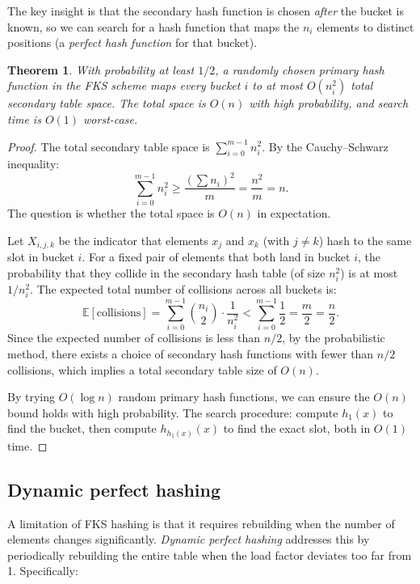 \documentclass[twoside,12pt]{book}
\theoremstyle{plain}
\newtheorem{theorem}{Theorem}[chapter]
\theoremstyle{definition}
\theoremstyle{remark}
\begin{document}
The key insight is that the secondary hash function is chosen \emph{after} the bucket is known, so we can search for a hash function that maps the $n_i$ elements to distinct positions (a \emph{perfect hash function} for that bucket).

\begin{theorem}\label{thm:fks}
With probability at least $1/2$, a randomly chosen primary hash function in the FKS scheme maps every bucket $i$ to at most $O(n_i^2)$ total secondary table space. The total space is $O(n)$ with high probability, and search time is $O(1)$ worst-case.
\end{theorem}

\begin{proof}
The total secondary table space is $\sum_{i=0}^{m-1} n_i^2$. By the Cauchy--Schwarz inequality:
\[
\sum_{i=0}^{m-1} n_i^2 \geq \frac{(\sum n_i)^2}{m} = \frac{n^2}{m} = n.
\]
The question is whether the total space is $O(n)$ in expectation.

Let $X_{i,j,k}$ be the indicator that elements $x_j$ and $x_k$ (with $j \neq k$) hash to the same slot in bucket $i$. For a fixed pair of elements that both land in bucket $i$, the probability that they collide in the secondary hash table (of size $n_i^2$) is at most $1/n_i^2$. The expected total number of collisions across all buckets is:
\[
\mathbb{E}[\text{collisions}] = \sum_{i=0}^{m-1} \binom{n_i}{2} \cdot \frac{1}{n_i^2} < \sum_{i=0}^{m-1} \frac{1}{2} = \frac{m}{2} = \frac{n}{2}.
\]
Since the expected number of collisions is less than $n/2$, by the probabilistic method, there exists a choice of secondary hash functions with fewer than $n/2$ collisions, which implies a total secondary table size of $O(n)$.

By trying $O(\log n)$ random primary hash functions, we can ensure the $O(n)$ bound holds with high probability. The search procedure: compute $h_1(x)$ to find the bucket, then compute $h_{h_1(x)}(x)$ to find the exact slot, both in $O(1)$ time.
\end{proof}

\subsection{Dynamic perfect hashing}

A limitation of FKS hashing is that it requires rebuilding when the number of elements changes significantly. \emph{Dynamic perfect hashing} addresses this by periodically rebuilding the entire table when the load factor deviates too far from 1. Specifically:
\end{document}
